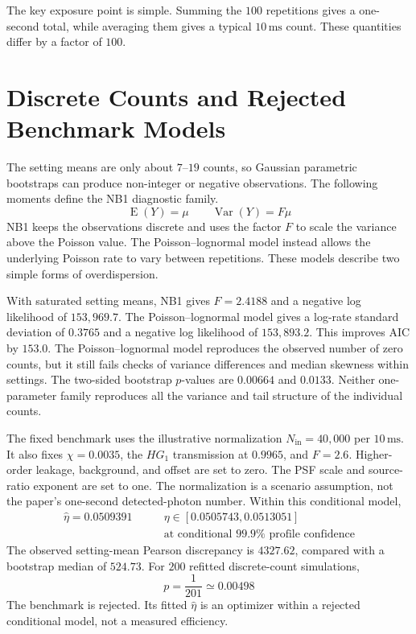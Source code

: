 The key exposure point is simple.  Summing the $100$ repetitions gives a one-second total, while averaging them gives a typical $10\,\mathrm{ms}$ count.  These quantities differ by a factor of $100$.

\section{Discrete Counts and Rejected Benchmark Models}

The setting means are only about $7$--$19$ counts, so Gaussian parametric bootstraps can produce non-integer or negative observations.  The following moments define the NB1 diagnostic family.
\begin{equation}
    \operatorname{E}(Y)=\mu
    \qquad
    \operatorname{Var}(Y)=F\mu
    \label{eq:spade_nb1_moments}
\end{equation}
NB1 keeps the observations discrete and uses the factor $F$ to scale the variance above the Poisson value.  The Poisson--lognormal model instead allows the underlying Poisson rate to vary between repetitions.  These models describe two simple forms of overdispersion.

With saturated setting means, NB1 gives $F=2.4188$ and a negative log likelihood of $153{,}969.7$.  The Poisson--lognormal model gives a log-rate standard deviation of $0.3765$ and a negative log likelihood of $153{,}893.2$.  This improves AIC by $153.0$.  The Poisson--lognormal model reproduces the observed number of zero counts, but it still fails checks of variance differences and median skewness within settings.  The two-sided bootstrap $p$-values are $0.00664$ and $0.0133$.  Neither one-parameter family reproduces all the variance and tail structure of the individual counts.

The fixed benchmark uses the illustrative normalization $N_{\mathrm{in}}=40{,}000$ per $10\,\mathrm{ms}$.  It also fixes $\chi=0.0035$, the $HG_1$ transmission at $0.9965$, and $F=2.6$.  Higher-order leakage, background, and offset are set to zero.  The PSF scale and source-ratio exponent are set to one.  The normalization is a scenario assumption, not the paper's one-second detected-photon number.  Within this conditional model,
\begin{equation}
    \begin{aligned}
        \widehat{\eta}=0.0509391
        \qquad &
        \eta\in[0.0505743,0.0513051]
        \\
               & \text{at conditional }99.9\%\text{ profile confidence}
    \end{aligned}
    \label{eq:spade_conditional_eta}
\end{equation}
The observed setting-mean Pearson discrepancy is $4327.62$, compared with a bootstrap median of $524.73$.  For $200$ refitted discrete-count simulations,
\begin{equation}
    p=\frac{1}{201}\simeq0.00498
    \label{eq:spade_fixed_rejection}
\end{equation}
The benchmark is rejected.  Its fitted $\widehat\eta$ is an optimizer within a rejected conditional model, not a measured efficiency.

